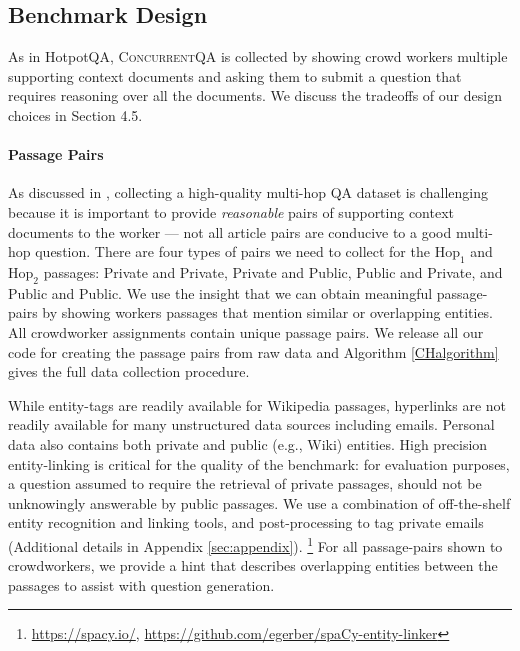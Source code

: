 \documentclass{article}
\newcommand{\datasetname}{\textsc{ConcurrentQA}\xspace}
\begin{document}
\subsection{Benchmark Design} 
As in HotpotQA, \datasetname is collected by showing crowd workers multiple supporting context documents and asking them to submit a question that requires reasoning over all the documents. 
We discuss the tradeoffs of our design choices in Section 4.5.

\paragraph{Passage Pairs}  As discussed in \citet{yang2018hotpotqa}, collecting a high-quality multi-hop QA dataset is challenging because it is important to provide \textit{reasonable} pairs of supporting context documents to the worker --- not all article pairs are conducive to a good multi-hop question. There are four types of pairs we need to collect for the $\mathrm{Hop_1}$ and $\mathrm{Hop_2}$ passages: Private and Private, Private and Public, Public and Private, and Public and Public.  We use the insight that we can obtain meaningful passage-pairs by showing workers passages that mention similar or overlapping entities. All crowdworker assignments contain unique passage pairs. We release all our code for creating the passage pairs from raw data and Algorithm \ref{CHalgorithm} gives the full data collection procedure.



While entity-tags are readily available for Wikipedia passages, hyperlinks are not readily available for many unstructured data sources including emails. Personal data also contains both private and public (e.g., Wiki) entities. High precision entity-linking is critical for the quality of the benchmark: for evaluation purposes, a question assumed to require the retrieval of private passages, should not be unknowingly answerable by public passages. We use a combination of off-the-shelf entity recognition and linking tools, and post-processing to tag private emails (Additional details in Appendix \ref{sec:appendix}). \footnote{\url{https://spacy.io/}, \url{https://github.com/egerber/spaCy-entity-linker}} For all passage-pairs shown to crowdworkers, we provide a hint that describes overlapping entities between the passages to assist with question generation.
\end{document}
